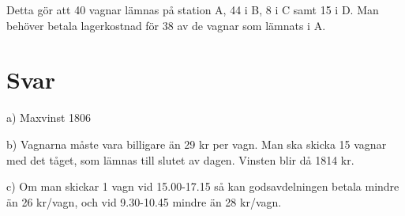 \documentclass[a4paper,titlepage,12pt]{article}
\begin{document}
Detta gör att 40 vagnar lämnas på station A, 44 i B, 8 i C samt 15 i D. Man
behöver betala lagerkostnad för 38 av de vagnar som lämnats i A.

\section*{Svar}

a) Maxvinst 1806

b) Vagnarna måste vara billigare än 29 kr per vagn. Man ska skicka 15 vagnar
med det tåget, som lämnas till slutet av dagen. Vinsten blir då 1814 kr.

c) Om man skickar 1 vagn vid 15.00-17.15 så kan godsavdelningen betala mindre än 26
kr/vagn, och vid 9.30-10.45 mindre än 28 kr/vagn.
\end{document}

